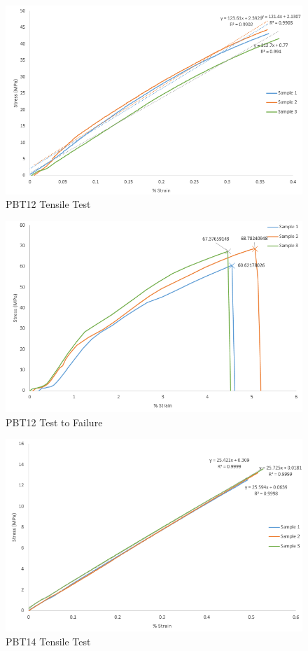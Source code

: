 \documentclass[11pt]{article}
\begin{document}
\begin{figure}[H]
\centering
\includegraphics[width=.95\linewidth]{figures/PBT12_Tensile.png}
\caption{PBT12 Tensile Test}
\label{pbt12tensile}
\end{figure}

\begin{figure}[H]
\centering
\includegraphics[width=.95\linewidth]{figures/PBT12_Fail.png}
\caption{PBT12 Test to Failure}
\label{pbt12fail}
\end{figure}

\begin{figure}[H]
\centering
\includegraphics[width=.95\linewidth]{figures/PBT14_Tensile.png}
\caption{PBT14 Tensile Test}
\label{pbt14tensile}
\end{figure}
\end{document}
